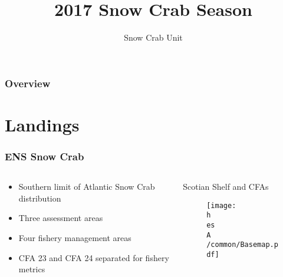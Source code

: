 \documentclass{beamer}
\title[Snow Crab RAP 2018]{2017 Snow Crab Season} %
\author{Snow Crab Unit} %
\institute[DFO] %
{
Department of Fisheries and Oceans \\ %
\medskip
\textit{} %
}
\date{\the\year} %
\newcommand{\h}{C:/} %
\newcommand{\es}{bio.data/bio.snowcrab/}
\newcommand{\A}{assessments/}
\begin{document}
\begin{frame}
\titlepage %
\end{frame}

\begin{frame}
\frametitle{Overview} %
\tableofcontents %
\end{frame}


\section{Landings}

\begin{frame}
\frametitle{ENS Snow Crab}
\begin{columns}[T]
	\begin{column}{0.4\textwidth}
		\begin{itemize}
			\item Southern limit of Atlantic Snow Crab distribution 
			\item Three assessment areas
			\item Four fishery management areas
			\item CFA 23 and CFA 24 separated for fishery metrics
		\end{itemize}
	\end{column}
	
	\begin{column}{0.6\textwidth}
		\begin{centering}
			Scotian Shelf and CFAs
			\begin{figure}
				\texttt{[image: \\h \\es \\A /common/Basemap.pdf]}
			\end{figure}
		\end{centering}
	\end{column}
\end{columns}
\end{frame}
\end{document}
